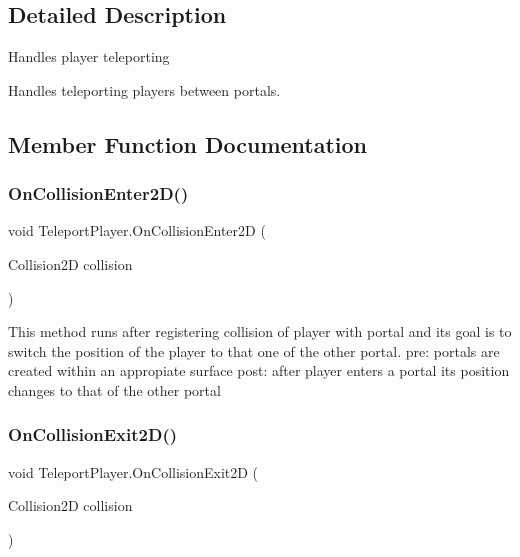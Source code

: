 \subsection{Detailed Description}
Handles player teleporting

Handles teleporting players between portals. 

\subsection{Member Function Documentation}
\mbox{\label{class_teleport_player_a1ab94b6c3d13f1287f9127393afe2298}} 
\subsubsection{\texorpdfstring{On\+Collision\+Enter2\+D()}{OnCollisionEnter2D()}}
{\footnotesize\ttfamily void Teleport\+Player.\+On\+Collision\+Enter2D (\begin{DoxyParamCaption}\item[{Collision2D}]{collision }\end{DoxyParamCaption})\hspace{0.3cm}{\ttfamily [inline]}}

This method runs after registering collision of player with portal and its goal is to switch the position of the player to that one of the other portal. pre\+: portals are created within an appropiate surface post\+: after player enters a portal it\textquotesingle{}s position changes to that of the other portal \mbox{\label{class_teleport_player_ac85fc2322d2dc27de518434422c2c25e}} 
\subsubsection{\texorpdfstring{On\+Collision\+Exit2\+D()}{OnCollisionExit2D()}}
{\footnotesize\ttfamily void Teleport\+Player.\+On\+Collision\+Exit2D (\begin{DoxyParamCaption}\item[{Collision2D}]{collision }\end{DoxyParamCaption})\hspace{0.3cm}{\ttfamily [inline]}}

